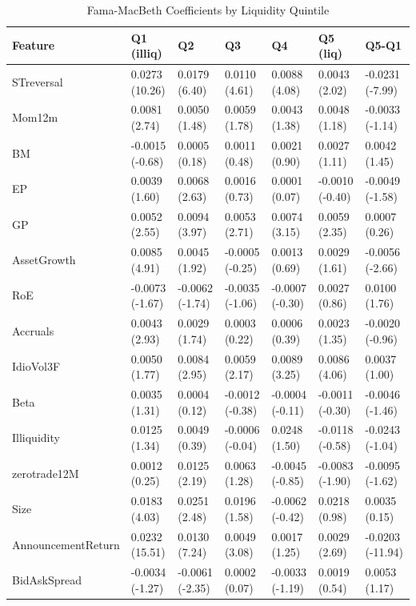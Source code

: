 \begin{table}
\caption{Fama-MacBeth Coefficients by Liquidity Quintile}
\label{tab:quintile_fm}
\begin{tabular}{lllllll}
\toprule
Feature & Q1 (illiq) & Q2 & Q3 & Q4 & Q5 (liq) & Q5-Q1 \\
\midrule
STreversal & 0.0273 (10.26) & 0.0179 (6.40) & 0.0110 (4.61) & 0.0088 (4.08) & 0.0043 (2.02) & -0.0231 (-7.99) \\
Mom12m & 0.0081 (2.74) & 0.0050 (1.48) & 0.0059 (1.78) & 0.0043 (1.38) & 0.0048 (1.18) & -0.0033 (-1.14) \\
BM & -0.0015 (-0.68) & 0.0005 (0.18) & 0.0011 (0.48) & 0.0021 (0.90) & 0.0027 (1.11) & 0.0042 (1.45) \\
EP & 0.0039 (1.60) & 0.0068 (2.63) & 0.0016 (0.73) & 0.0001 (0.07) & -0.0010 (-0.40) & -0.0049 (-1.58) \\
GP & 0.0052 (2.55) & 0.0094 (3.97) & 0.0053 (2.71) & 0.0074 (3.15) & 0.0059 (2.35) & 0.0007 (0.26) \\
AssetGrowth & 0.0085 (4.91) & 0.0045 (1.92) & -0.0005 (-0.25) & 0.0013 (0.69) & 0.0029 (1.61) & -0.0056 (-2.66) \\
RoE & -0.0073 (-1.67) & -0.0062 (-1.74) & -0.0035 (-1.06) & -0.0007 (-0.30) & 0.0027 (0.86) & 0.0100 (1.76) \\
Accruals & 0.0043 (2.93) & 0.0029 (1.74) & 0.0003 (0.22) & 0.0006 (0.39) & 0.0023 (1.35) & -0.0020 (-0.96) \\
IdioVol3F & 0.0050 (1.77) & 0.0084 (2.95) & 0.0059 (2.17) & 0.0089 (3.25) & 0.0086 (4.06) & 0.0037 (1.00) \\
Beta & 0.0035 (1.31) & 0.0004 (0.12) & -0.0012 (-0.38) & -0.0004 (-0.11) & -0.0011 (-0.30) & -0.0046 (-1.46) \\
Illiquidity & 0.0125 (1.34) & 0.0049 (0.39) & -0.0006 (-0.04) & 0.0248 (1.50) & -0.0118 (-0.58) & -0.0243 (-1.04) \\
zerotrade12M & 0.0012 (0.25) & 0.0125 (2.19) & 0.0063 (1.28) & -0.0045 (-0.85) & -0.0083 (-1.90) & -0.0095 (-1.62) \\
Size & 0.0183 (4.03) & 0.0251 (2.48) & 0.0196 (1.58) & -0.0062 (-0.42) & 0.0218 (0.98) & 0.0035 (0.15) \\
AnnouncementReturn & 0.0232 (15.51) & 0.0130 (7.24) & 0.0049 (3.08) & 0.0017 (1.25) & 0.0029 (2.69) & -0.0203 (-11.94) \\
BidAskSpread & -0.0034 (-1.27) & -0.0061 (-2.35) & 0.0002 (0.07) & -0.0033 (-1.19) & 0.0019 (0.54) & 0.0053 (1.17) \\
\bottomrule
\end{tabular}
\end{table}
